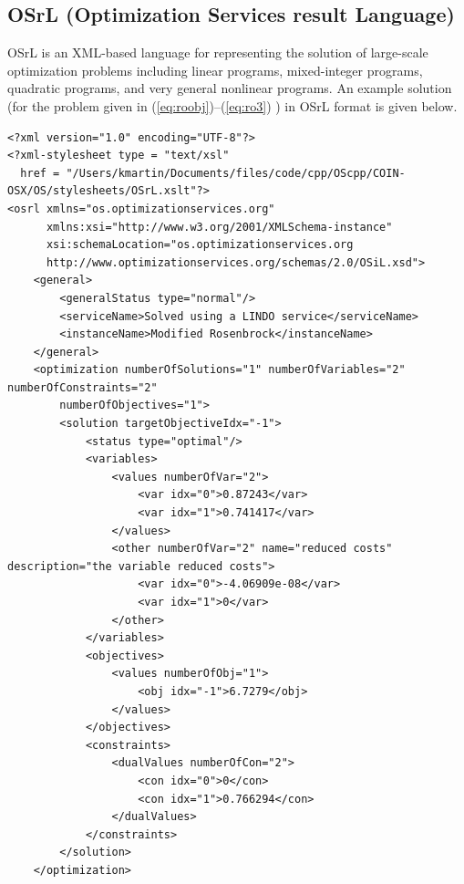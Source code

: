 \documentclass[11pt]{article}
\renewcommand{\_}{{\char"5F}}
\renewcommand{\{}{{\char"7B}}
\renewcommand{\}}{{\char"7D}}
\renewcommand{\^}{{\char"0D}}
\renewcommand{\'}{{\char"0D}}
\begin{document}
\begin{enumerate}[Step 1:]
\subsection{OSrL (Optimization Services result Language)} \label{section:osrlschema}
OSrL is an XML-based language for representing the solution of large-scale
optimization problems including linear programs, mixed-integer programs,
quadratic programs, and very general nonlinear programs.  An example solution (for the problem given in
 (\ref{eq:roobj})--(\ref{eq:ro3}) ) in OSrL format is given below.

{\small
\begin{verbatim}
<?xml version="1.0" encoding="UTF-8"?>
<?xml-stylesheet type = "text/xsl"
  href = "/Users/kmartin/Documents/files/code/cpp/OScpp/COIN-OSX/OS/stylesheets/OSrL.xslt"?>
<osrl xmlns="os.optimizationservices.org"
      xmlns:xsi="http://www.w3.org/2001/XMLSchema-instance"
      xsi:schemaLocation="os.optimizationservices.org
      http://www.optimizationservices.org/schemas/2.0/OSiL.xsd">
    <general>
        <generalStatus type="normal"/>
        <serviceName>Solved using a LINDO service</serviceName>
        <instanceName>Modified Rosenbrock</instanceName>
    </general>
    <optimization numberOfSolutions="1" numberOfVariables="2" numberOfConstraints="2"
        numberOfObjectives="1">
        <solution targetObjectiveIdx="-1">
            <status type="optimal"/>
            <variables>
                <values numberOfVar="2">
                    <var idx="0">0.87243</var>
                    <var idx="1">0.741417</var>
                </values>
                <other numberOfVar="2" name="reduced costs" description="the variable reduced costs">
                    <var idx="0">-4.06909e-08</var>
                    <var idx="1">0</var>
                </other>
            </variables>
            <objectives>
                <values numberOfObj="1">
                    <obj idx="-1">6.7279</obj>
                </values>
            </objectives>
            <constraints>
                <dualValues numberOfCon="2">
                    <con idx="0">0</con>
                    <con idx="1">0.766294</con>
                </dualValues>
            </constraints>
        </solution>
    </optimization>
\end{verbatim}
}




\end{enumerate}
\end{document}
